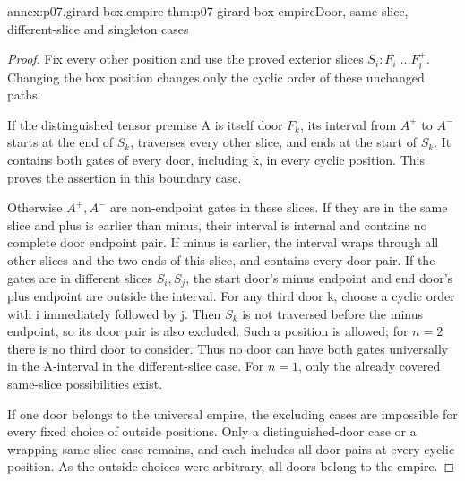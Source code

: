 \begin{annexitem}{annex:p07.girard-box.empire}
 {thm:p07-girard-box-empire}{Door, same-slice, different-slice and singleton cases}
\begin{proof}
Fix every other position and use the proved exterior slices
\(S_i:F_i^-\ldots F_i^+\).
Changing the box position changes only the cyclic order of these
unchanged paths.

If the distinguished tensor premise A is itself door \(F_k\), its
interval from \(A^+\) to \(A^-\) starts at the end of \(S_k\),
traverses every other slice, and ends at the start of \(S_k\).
It contains both gates of every door, including k, in every cyclic
position. This proves the assertion in this boundary case.

Otherwise \(A^+,A^-\) are non-endpoint gates in these slices.
If they are in the same slice and plus is earlier than minus,
their interval is internal and contains no complete door endpoint pair.
If minus is earlier, the interval wraps through all other slices and
the two ends of this slice, and contains every door pair.
If the gates are in different slices \(S_i,S_j\), the start door's
minus endpoint and end door's plus endpoint are outside the interval.
For any third door k, choose a cyclic order with i immediately
followed by j. Then \(S_k\) is not traversed before the minus endpoint,
so its door pair is also excluded. Such a position is allowed;
for \(n=2\) there is no third door to consider.
Thus no door can have both gates universally in the A-interval in
the different-slice case. For \(n=1\), only the already covered
same-slice possibilities exist.

If one door belongs to the universal empire, the excluding cases
are impossible for every fixed choice of outside positions.
Only a distinguished-door case or a wrapping same-slice case remains,
and each includes all door pairs at every cyclic position.
As the outside choices were arbitrary, all doors belong to the empire.
\end{proof}
\end{annexitem}

